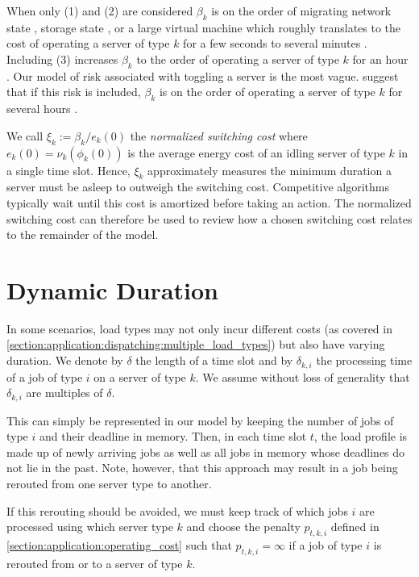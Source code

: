 When only (1) and (2) are considered $\beta_k$ is on the order of migrating network state \cite{Chen2008}, storage state \cite{Thereska2009}, or a large virtual machine \cite{Clark2005} which roughly translates to the cost of operating a server of type $k$ for a few seconds to several minutes \cite{Lin2011}. Including (3) increases $\beta_k$ to the order of operating a server of type $k$ for an hour \cite{Bodik2008}. Our model of risk associated with toggling a server is the most vague. \citeauthor*{Lin2011} suggest that if this risk is included, $\beta_k$ is on the order of operating a server of type $k$ for several hours \cite{Lin2011}.

We call $\xi_k := \beta_k / e_k(0)$ the \textit{normalized switching cost} where $e_k(0) = \nu_k(\phi_k(0))$ is the average energy cost of an idling server of type $k$ in a single time slot. Hence, $\xi_k$ approximately measures the minimum duration a server must be asleep to outweigh the switching cost. Competitive algorithms typically wait until this cost is amortized before taking an action. The normalized switching cost can therefore be used to review how a chosen switching cost relates to the remainder of the model.

\section{Dynamic Duration}\label{section:application:dynamic_duration}

In some scenarios, load types may not only incur different costs (as covered in \autoref{section:application:dispatching:multiple_load_types}) but also have varying duration. We denote by $\delta$ the length of a time slot and by $\delta_{k,i}$ the processing time of a job of type $i$ on a server of type $k$. We assume without loss of generality that $\delta_{k,i}$ are multiples of $\delta$.

This can simply be represented in our model by keeping the number of jobs of type $i$ and their deadline in memory. Then, in each time slot $t$, the load profile is made up of newly arriving jobs as well as all jobs in memory whose deadlines do not lie in the past. Note, however, that this approach may result in a job being rerouted from one server type to another.

If this rerouting should be avoided, we must keep track of which jobs $i$ are processed using which server type $k$ and choose the penalty $p_{t,k,i}$ defined in \autoref{section:application:operating_cost} such that $p_{t,k,i} = \infty$ if a job of type $i$ is rerouted from or to a server of type $k$.

